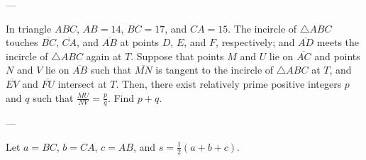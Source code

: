 
---

In triangle $ABC$, $AB=14$, $BC=17$, and $CA=15$. The incircle of $\triangle ABC$ touches $\overline{BC}$, $\overline{CA}$, and $\overline{AB}$ at points $D$, $E$, and $F$, respectively; and $\overline{AD}$ meets the incircle of $\triangle ABC$ again at $T$. Suppose that points $M$ and $U$ lie on $\overline{AC}$ and points $N$ and $V$ lie on $\overline{AB}$ such that $\overline{MN}$ is tangent to the incircle of $\triangle ABC$ at $T$, and $\overline{EV}$ and $\overline{FU}$ intersect at $T$. Then, there exist relatively prime positive integers $p$ and $q$ such that $\tfrac{MU}{NV}=\tfrac pq$. Find $p+q$.

---

Let $a=BC$, $b=CA$, $c=AB$, and $s=\tfrac12(a+b+c)$.

